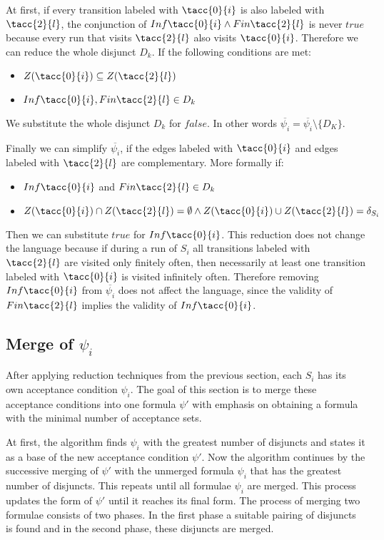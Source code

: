 \documentclass[a4paper,UKenglish,cleveref, autoref, thm-restate]{lipics-v2021}
\def\Inf{\ensuremath{\mathsf{Inf}}}
\def\Fin{\ensuremath{\mathsf{Fin}}}
\def\false{\mathit{false}}
\def\true{\mathit{true}}
\begin{document}
At first, if every transition labeled with  $\tacc{0}{i}$ is also labeled with $\tacc{2}{l}$, the conjunction of $\Inf\tacc{0}{i} \land \Fin\tacc{2}{l}$ is never $\true$ because every run that visits $\tacc{2}{l}$ also visits $\tacc{0}{i}$. Therefore we can reduce the whole disjunct $D_{k}$.
If the following conditions are met:
\begin{itemize}
    \item $Z(\tacc{0}{i}) \subseteq Z(\tacc{2}{l})$
    \item $\Inf\tacc{0}{i}, \Fin\tacc{2}{l} \in D_{k}$
\end{itemize}
We substitute the whole disjunct $D_{k}$ for $\false$. In other words $\overline{\psi_{i}} = \overline{\psi_{i}} \setminus \{D_{K}\}$.

Finally we can simplify $\overline{\psi_{i}}$, if the edges labeled with $\tacc{0}{i}$ and edges labeled with $\tacc{2}{l}$ are complementary.
More formally if:
\begin{itemize}
    \item  $\Inf\tacc{0}{i}$ and $\Fin\tacc{2}{l} \in D_{k}$
    \item $Z(\tacc{0}{i}) \cap Z(\tacc{2}{l}) = \emptyset \land Z(\tacc{0}{i}) \cup Z(\tacc{2}{l}) = \delta_{S_{i}} $
\end{itemize}
Then we can substitute $\true$ for $\Inf\tacc{0}{i}$.
This reduction does not change the language because if during a run of $S_{i}$ all transitions labeled with $\tacc{2}{l}$ are visited only finitely often, then necessarily at least one transition labeled with $\tacc{0}{i}$ is visited infinitely often. Therefore removing $\Inf\tacc{0}{i}$ from $\overline{\psi_{i}}$ does not affect the language, since the validity of $\Fin\tacc{2}{l}$ implies the validity of $\Inf\tacc{0}{i}$.

\subsection{Merge of $\psi_{i}$}
After applying reduction techniques from the previous section, each $S_{i}$ has its own acceptance condition $\psi_{i}$. The goal of this section is to merge these acceptance conditions into one formula $\psi'$ with emphasis on obtaining a formula with the minimal number of acceptance sets.

At first, the algorithm finds $\psi_{i}$ with the greatest number of disjuncts and states it as a base of the new acceptance condition $\psi'$. Now the algorithm continues by the successive merging of $\psi'$ with the unmerged formula $\psi_{i}$ that has the greatest number of disjuncts. This repeats until all formulae $\psi_{i}$ are merged. This process updates the form of $\psi'$ until it reaches its final form. The process of merging two formulae consists of two phases. In the first phase a suitable pairing of disjuncts is found and in the second phase, these disjuncts are merged.
\end{document}
